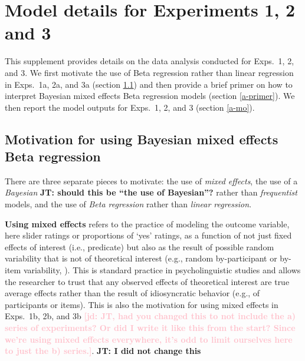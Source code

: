 \documentclass[11pt,fleqn]{article}
\newcommand{\jd}[1]{\textbf{\textcolor{Pink}{[jd: #1]}}}
\newcommand{\6}{\mbox{$[\hspace*{-.6mm}[$}}
\newcommand{\9}{\mbox{$]\hspace*{-.6mm}]$}}
\newcommand{\jt}[1]{\textbf{\color{blue}JT: #1}}
\begin{document}
\section{Model details for Experiments 1, 2 and 3}\label{modeldetails}

This supplement provides details on the data analysis conducted for Exps.~1, 2, and 3. We first motivate the use of Beta regression rather than linear regression in Exps.~1a, 2a, and 3a (section \ref{a-motivation}) and then provide a brief primer on how to interpret Bayesian mixed effects Beta regression models (section \ref{a-primer}). We then report the model outputs for Exps.~1, 2, and 3 (section \ref{a-mo}).

\subsection{Motivation for using Bayesian mixed effects Beta regression}\label{a-motivation}

There are three separate pieces to motivate: the use of \emph{mixed effects}, the use of a \emph{Bayesian} \jt{should this be ``the use of Bayesian''?} rather than \emph{frequentist} models, and the use of \emph{Beta regression} rather than \emph{linear regression}. 

\textbf{Using mixed effects} refers to the practice of modeling the outcome variable, here slider ratings or proportions of `yes' ratings, as a function of not just fixed effects of interest (i.e., predicate) but also as the result of possible random variability that is not of theoretical interest (e.g., random by-participant or by-item variability, \citet{gelman2006}). This is standard practice in psycholinguistic studies and allows the researcher to trust that any observed effects of theoretical interest are true average effects rather than the result of idiosyncratic behavior (e.g., of participants or items). This is also the motivation for using mixed effects in Exps.~1b, 2b, and 3b \jd{JT, had you changed this to not include the a) series of experiments? Or did I write it like this from the start? Since we're using mixed effects everywhere, it's odd to limit ourselves here to just the b) series.}. \jt{I did not change this}
\end{document}
